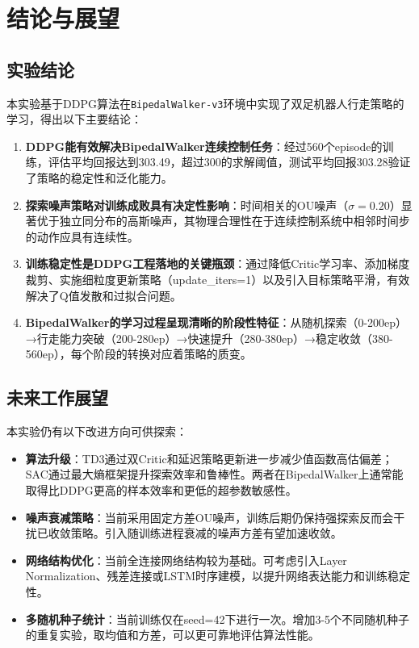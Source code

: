 \documentclass[UTF8,a4paper,12pt]{ctexart}
\begin{document}
\section{结论与展望}

\subsection{实验结论}

本实验基于DDPG算法在\texttt{BipedalWalker-v3}环境中实现了双足机器人行走策略的学习，得出以下主要结论：

\begin{enumerate}[leftmargin=2em]
  \item \textbf{DDPG能有效解决BipedalWalker连续控制任务}：经过560个episode的训练，评估平均回报达到303.49，超过300的求解阈值，测试平均回报303.28验证了策略的稳定性和泛化能力。
  \item \textbf{探索噪声策略对训练成败具有决定性影响}：时间相关的OU噪声（$\sigma=0.20$）显著优于独立同分布的高斯噪声，其物理合理性在于连续控制系统中相邻时间步的动作应具有连续性。
  \item \textbf{训练稳定性是DDPG工程落地的关键瓶颈}：通过降低Critic学习率、添加梯度裁剪、实施细粒度更新策略（update\_iters=1）以及引入目标策略平滑，有效解决了Q值发散和过拟合问题。
  \item \textbf{BipedalWalker的学习过程呈现清晰的阶段性特征}：从随机探索（0-200ep）→行走能力突破（200-280ep）→快速提升（280-380ep）→稳定收敛（380-560ep），每个阶段的转换对应着策略的质变。
\end{enumerate}

\subsection{未来工作展望}

本实验仍有以下改进方向可供探索：

\begin{itemize}[leftmargin=2em]
  \item \textbf{算法升级}：TD3\cite{fujimoto2018td3}通过双Critic和延迟策略更新进一步减少值函数高估偏差；SAC\cite{haarnoja2018sac}通过最大熵框架提升探索效率和鲁棒性。两者在BipedalWalker上通常能取得比DDPG更高的样本效率和更低的超参数敏感性。
  \item \textbf{噪声衰减策略}：当前采用固定方差OU噪声，训练后期仍保持强探索反而会干扰已收敛策略。引入随训练进程衰减的噪声方差有望加速收敛。
  \item \textbf{网络结构优化}：当前全连接网络结构较为基础。可考虑引入Layer Normalization、残差连接或LSTM时序建模，以提升网络表达能力和训练稳定性。
  \item \textbf{多随机种子统计}：当前训练仅在seed=42下进行一次。增加3-5个不同随机种子的重复实验，取均值和方差，可以更可靠地评估算法性能。
\end{itemize}
\end{document}
